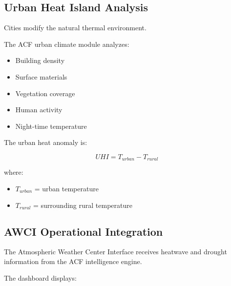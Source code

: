 
\subsection{Urban Heat Island Analysis}

Cities modify the natural thermal environment.

The ACF urban climate module analyzes:

\begin{itemize}

\item Building density

\item Surface materials

\item Vegetation coverage

\item Human activity

\item Night-time temperature

\end{itemize}


The urban heat anomaly is:

\[
UHI =
T_{urban}
-
T_{rural}
\]


where:

\begin{itemize}

\item $T_{urban}$ = urban temperature

\item $T_{rural}$ = surrounding rural temperature

\end{itemize}



\subsection{AWCI Operational Integration}

The Atmospheric Weather Center Interface receives heatwave and drought
information from the ACF intelligence engine.

The dashboard displays:

